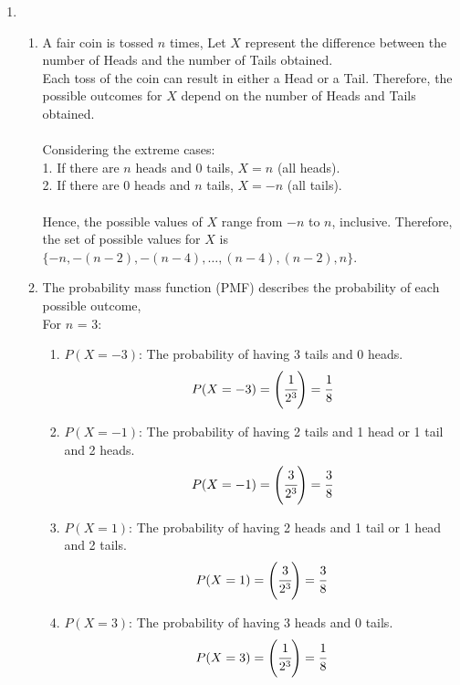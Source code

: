 \documentclass{article}
\begin{document}
\begin{enumerate}
\newpage
\item 
  \begin{enumerate}
    \item 
      A fair coin is tossed $n$ times, Let $X$ represent the difference between the number of Heads and the number of Tails obtained.\\
      Each toss of the coin can result in either a Head or a Tail. Therefore, the possible outcomes for $X$ depend on the number of Heads and Tails obtained.\\\\
      Considering the extreme cases:\\
      1. If there are \( n \) heads and 0 tails, \( X = n \) (all heads).\\
      2. If there are 0 heads and \( n \) tails, \( X = -n \) (all tails).\\\\
      Hence, the possible values of \( X \) range from \( -n \) to \( n \), inclusive. Therefore, the set of possible values for \( X \) is \( \{-n, -(n-2), -(n-4), \ldots, (n-4), (n-2), n\} \).\\
    \item 
    The probability mass function (PMF) describes the probability of each possible outcome,\\ For $n$ = 3:
    \begin{enumerate}
      \item \(P(X = -3)\): The probability of having 3 tails and 0 heads.
      \[ P(X = -3) = \left(\cfrac{1}{2^3}\right) = \cfrac{1}{8} \]
      \item \(P(X = -1)\): The probability of having 2 tails and 1 head or 1 tail and 2 heads.
      \[ P(X = -1) = \left(\cfrac{3}{2^3}\right) = \cfrac{3}{8} \]
      \item \(P(X = 1)\): The probability of having 2 heads and 1 tail or 1 head and 2 tails.
      \[ P(X = 1) = \left(\cfrac{3}{2^3}\right) = \cfrac{3}{8} \]
      \item \(P(X = 3)\): The probability of having 3 heads and 0 tails.
      \[ P(X = 3) = \left(\cfrac{1}{2^3}\right) = \cfrac{1}{8} \]
    \end{enumerate}
  \end{enumerate}


\end{enumerate}
\end{document}
